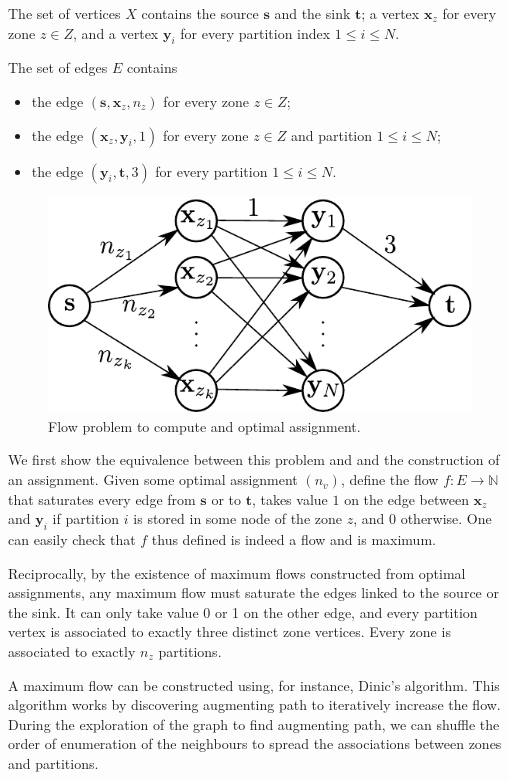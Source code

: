 \documentclass[]{article}
\begin{document}
The set of vertices $X$ contains the source $\mathbf{s}$ and the sink $\mathbf{t}$; a vertex $\mathbf{x}_z$ for every zone $z\in Z$, and a vertex $\mathbf{y}_i$ for every partition index $1\le i\le N$. 

The set of edges $E$ contains
\begin{itemize}
	\item the edge $(\mathbf{s}, \mathbf{x}_z, n_z)$ for every zone $z\in Z$;
	\item the edge $(\mathbf{x}_z, \mathbf{y}_i, 1)$ for every zone $z\in Z$ and partition $1\le i\le N$;
	\item the edge $(\mathbf{y}_i, \mathbf{t}, 3)$ for every partition $1\le i\le N$.
\end{itemize}

\begin{figure}[b]
	\centering
	\includegraphics[width=0.6\linewidth]{figures/flow}
	\caption{Flow problem to compute and optimal assignment.}
\end{figure}

We first show the equivalence between this problem and and the construction of an assignment. Given some optimal assignment $(n_v)$, define the flow $f:E\to \mathbb{N}$ that saturates every edge from $\mathbf{s}$ or to $\mathbf{t}$, takes value $1$ on the edge between $\mathbf{x}_z$ and $\mathbf{y}_i$ if partition $i$ is stored in some node of the zone $z$, and $0$ otherwise. One can easily check that $f$ thus defined is indeed a flow and is maximum.

Reciprocally, by the existence of maximum flows constructed from optimal assignments, any maximum flow must saturate the edges linked to the source or the sink. It can only take value 0 or 1 on the other edge, and every partition vertex is associated to exactly three distinct zone vertices. Every zone is associated to exactly $n_z$ partitions.

A maximum flow can be constructed using, for instance, Dinic's algorithm. This algorithm works by discovering augmenting path to iteratively increase the flow. During the exploration of the graph to find augmenting path, we can shuffle the order of enumeration of the neighbours to spread the associations between zones and partitions.
\end{document}
